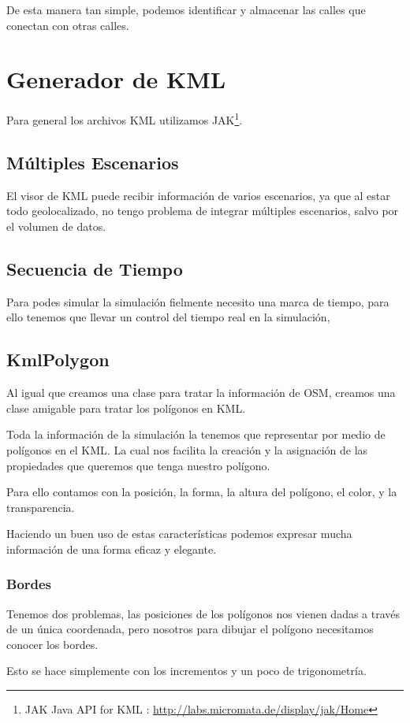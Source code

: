 De esta manera tan simple, podemos identificar y almacenar las calles que
conectan con otras calles.

\section*{Generador de KML}
Para general los archivos KML utilizamos
JAK\footnote{JAK Java API for KML :
\url{http://labs.micromata.de/display/jak/Home}}.
\subsection*{Múltiples Escenarios}
El visor de KML puede recibir información de varios escenarios, ya que al estar
todo geolocalizado, no tengo problema de integrar múltiples
escenarios, salvo por el volumen de datos.
\subsection*{Secuencia de Tiempo}
Para podes simular la simulación fielmente necesito una marca de tiempo, para
ello tenemos que llevar un control del tiempo real en la simulación, 
\subsection*{KmlPolygon}
Al igual que creamos una clase para tratar la información de OSM, creamos una
clase amigable para tratar los polígonos en KML.

Toda la información de la simulación la tenemos que representar por medio de
polígonos en el KML. La cual nos facilita la creación y la asignación de las
propiedades que queremos que tenga nuestro polígono.

Para ello contamos con la posición, la forma, la altura del polígono, el color,
y la transparencia.

Haciendo un buen uso de estas características podemos expresar mucha
información de una forma eficaz y elegante.
\subsubsection*{Bordes}
Tenemos dos problemas, las posiciones de los polígonos nos vienen dadas a
través de un única coordenada, pero nosotros para dibujar el polígono
necesitamos conocer los bordes.

Esto se hace simplemente con los incrementos y un poco de trigonometría.

